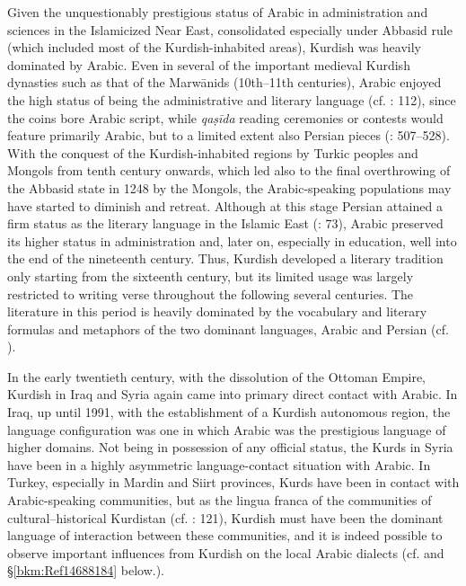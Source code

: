 \documentclass[output=paper]{langsci/langscibook}
\begin{document}
Given the unquestionably prestigious status of Arabic in administration and sciences in the Islamicized Near East, consolidated especially under Abbasid rule (which included most of the Kurdish-inhabited areas), Kurdish was heavily dominated by Arabic. Even in several of the important medieval Kurdish dynasties such as that of the Marwānids (10th–11th centuries), Arabic enjoyed the high status of being the administrative and literary language (cf. \citealt{James2007}: 112), since the coins bore Arabic script, while \textit{qaṣīda} reading ceremonies or contests would feature primarily Arabic, but to a limited extent also Persian pieces (\citealt{Ripper2012}: 507–528). With the conquest of the Kurdish-inhabited regions by Turkic peoples and Mongols from tenth century onwards, which led also to the final overthrowing of the Abbasid state in 1248 by the Mongols, the Arabic-speaking populations may have started to diminish and retreat. Although at this stage Persian attained a firm status as the literary language in the Islamic East (\citealt{Perry2012}: 73), Arabic preserved its higher status in administration and, later on, especially in education, well into the end of the nineteenth century. Thus, Kurdish developed a literary tradition only starting from the sixteenth century, but its limited usage was largely restricted to writing verse throughout the following several centuries. The literature in this period is heavily dominated by the vocabulary and literary formulas and metaphors of the two dominant languages, Arabic and Persian (cf. \citealt{Öpenginforthcoming}). 

In the early twentieth century, with the dissolution of the Ottoman Empire, Kurdish in Iraq and Syria again came into primary direct contact with Arabic. In Iraq, up until 1991, with the establishment of a Kurdish autonomous region, the language configuration was one in which Arabic was the prestigious language of higher domains. Not being in possession of any official status, the Kurds in Syria have been in a highly asymmetric language-contact situation with Arabic. In Turkey, especially in Mardin and Siirt provinces, Kurds have been in contact with Arabic-speaking communities, but as the lingua franca of the communities of cultural–historical Kurdistan (cf. \citealt{Edwards1851}: 121), Kurdish must have been the dominant language of interaction between these communities, and it is indeed possible to observe important influences from Kurdish on the local Arabic dialects (cf. \citealt{Jastrow2011Kurdish} and §\ref{bkm:Ref14688184} below.). 
\end{document}
